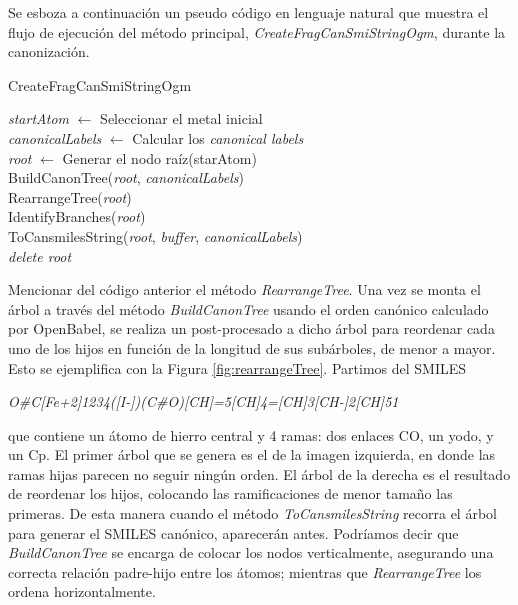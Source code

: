 Se esboza a continuación un pseudo código en lenguaje natural que muestra el flujo de ejecución del método principal, \textit{CreateFragCanSmiStringOgm}, durante la canonización. 
\begin{algorithm}[h!]
   \caption{CreateFragCanSmiStringOgm}
   \textit{startAtom} $\longleftarrow$ Seleccionar el metal inicial \\
   \textit{canonicalLabels} $\longleftarrow$ Calcular los \textit{canonical labels}\\
   \textit{root} $\longleftarrow$ Generar el nodo raíz(starAtom)\\
   BuildCanonTree(\textit{root}, \textit{canonicalLabels})\\
   RearrangeTree(\textit{root})\\
   IdentifyBranches(\textit{root})\\
   ToCansmilesString(\textit{root}, \textit{buffer}, \textit{canonicalLabels})\\
   \textit{delete root} \\
   \label{tab:CreateFragCanSmiStringOgm}
\end{algorithm}

Mencionar del código anterior el método \textit{RearrangeTree}. Una vez se monta el árbol a través del método \textit{BuildCanonTree} usando el orden canónico calculado por OpenBabel, se realiza un post-procesado a dicho árbol para reordenar cada uno de los hijos en función de la longitud de sus subárboles, de menor a mayor. Esto se ejemplifica con la Figura \ref{fig:rearrangeTree}. Partimos del SMILES

\begin{center}
\small
\textit{O\#C[Fe+2]1234([I-])(C\#O)[CH]=5[CH]4=[CH]3[CH-]2[CH]51}    
\end{center}

que contiene un átomo de hierro central y 4 ramas: dos enlaces CO, un yodo, y un Cp. El primer árbol que se genera es el de la imagen izquierda, en donde las ramas hijas parecen no seguir ningún orden. El árbol de la derecha es el resultado de reordenar los hijos, colocando las ramificaciones de menor tamaño las primeras. De esta manera cuando el método \textit{ToCansmilesString} recorra el árbol para generar el SMILES canónico,  aparecerán antes. Podríamos decir que \textit{BuildCanonTree} se encarga de colocar los nodos verticalmente, asegurando una correcta relación padre-hijo entre los átomos; mientras que \textit{RearrangeTree} los ordena horizontalmente.

